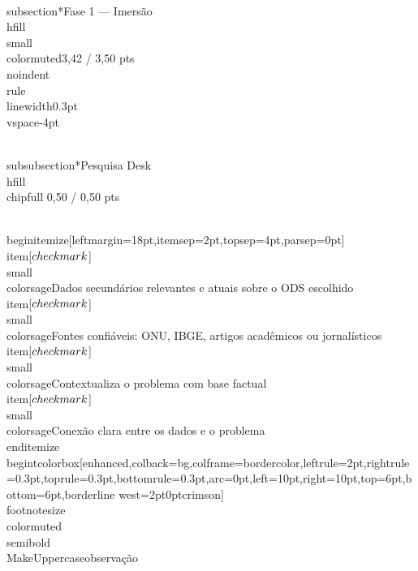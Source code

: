 \documentclass[11pt, a4paper]{article}
\newcommand{\chipfull}[1]{\colorbox{sagedim}{\color{sage}\semibold\small\strut\ #1\ }}
\begin{document}
\\subsection*{Fase 1 — Imersão \\hfill {\\small\\color{muted}3,42 / 3,50 pts}}
\\noindent\\rule{\\linewidth}{0.3pt}\\vspace{-4pt}

\\subsubsection*{Pesquisa Desk \\hfill {\\chipfull 0,50 / 0,50 pts}}

\\begin{itemize}[leftmargin=18pt,itemsep=2pt,topsep=4pt,parsep=0pt]
  \\item[$\\checkmark$] {\\small\\color{sage}Dados secundários relevantes e atuais sobre o ODS escolhido}
  \\item[$\\checkmark$] {\\small\\color{sage}Fontes confiáveis: ONU, IBGE, artigos acadêmicos ou jornalísticos}
  \\item[$\\checkmark$] {\\small\\color{sage}Contextualiza o problema com base factual}
  \\item[$\\checkmark$] {\\small\\color{sage}Conexão clara entre os dados e o problema}
\\end{itemize}
\\begin{tcolorbox}[enhanced,colback=bg,colframe=bordercolor,leftrule=2pt,rightrule=0.3pt,toprule=0.3pt,bottomrule=0.3pt,arc=0pt,left=10pt,right=10pt,top=6pt,bottom=6pt,borderline west={2pt}{0pt}{crimson}]
{\\footnotesize\\color{muted}\\semibold\\MakeUppercase{observação}}\\\\[4pt]
\end{document}

